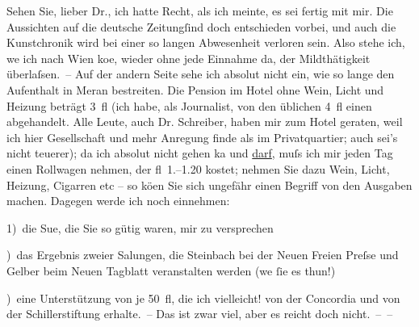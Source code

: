 \pstart
           Sehen Sie, lieber Dr., ich hatte Recht, als ich meinte, es sei fertig mit mir. Die
               Aussichten auf die deutsche Zeitungſind doch entschieden vorbei, und auch die Kunstchronik wird bei einer so langen Abwesenheit
               verloren sein. Also stehe ich, we{\geminationn} ich nach Wien ko{\geminationm}e, wieder ohne
               jede Einnahme da, der Mildthätigkeit überlaſsen. – Auf der andern Seite sehe ich
               absolut nicht ein, wie so lange den Aufenthalt in Meran bestreiten. Die Pension im Hotel ohne Wein, Licht und Heizung beträgt
               3 fl (ich habe, als Journalist, von den üblichen 4 fl einen abgehandelt. Alle Leute,
               auch Dr. Schreiber, haben mir zum Hotel
               geraten, weil ich hier Gesellschaft und mehr Anregung finde als im Privatquartier;
               auch sei’s nicht teuerer); da ich absolut nicht gehen ka{\geminationn} und \uline{darf}, muſs ich mir jeden Tag einen Rollwagen
               nehmen, der fl 1.–1.20 kostet; nehmen Sie dazu Wein, Licht, Heizung, Cigarren etc –
               so kö{\geminationn}en Sie sich ungefähr einen Begriff von den
               Ausgaben machen. Dagegen werde ich noch einnehmen: \pend
           
\pstart
           {\pb}1) die Su{\geminationm}e, die
               Sie so gütig waren, mir zu versprechen\pend
           
) das Ergebnis zweier Sa{\geminationm}lungen, die Steinbach bei der Neuen Freien Preſse und Gelber beim Neuen Tagblatt veranstalten
               werden (we{\geminationn}{ }ſie es thun!)\pend
           
) eine Unterstützung von je 50 fl, die ich vielleicht! von der Concordia und von der Schillerstiftung erhalte. – Das ist zwar viel, aber es reicht doch
               nicht. – –\pend
           
